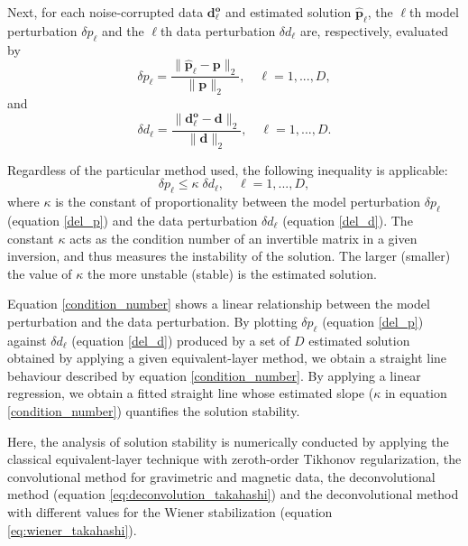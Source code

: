 Next, for each noise-corrupted data $\mathbf{d}^\mathbf{o}_\ell$
and estimated solution $\mathbf{\hat{p}}_\ell$, the $\ell$th model perturbation $\delta p_\ell $
and the $\ell$th data perturbation    $\delta d_\ell$ are,  respectively, evaluated by
\begin{equation}
\delta p_\ell = \frac{\parallel \mathbf{\hat{p}}_\ell - {\mathbf{p}} \parallel_2 }
{\parallel {\mathbf{p}} \parallel _2 }, \quad \ell= 1, ..., D,
\label{del_p}
\end{equation}
and
\begin{equation}
\delta d_\ell = \frac{\parallel \mathbf{d}^\mathbf{o}_\ell - \mathbf{d} \parallel _2 }
{\parallel \mathbf{d}\parallel _2}, \quad \ell = 1, ..., D.
\label{del_d}
\end{equation}

Regardless of the particular method used, the following inequality \citep[][ p. 66]{aster2018parameter}  is applicable:
\begin{equation}
\delta p_\ell \leq \kappa \; \delta d_\ell, \quad \ell = 1, ..., D,
\label{condition_number}
\end{equation}
where $\kappa$ is the constant of proportionality between the model perturbation $\delta p_\ell $ 
(equation \ref{del_p}) and the data perturbation   $\delta d_\ell$ (equation \ref{del_d}).
The constant $\kappa$ acts as the condition number of an invertible matrix in a given inversion, and thus
measures the instability of the solution.
The larger (smaller) the value of $\kappa$ the more unstable (stable) is the estimated solution.

Equation \ref{condition_number} shows a linear relationship between the model perturbation and 
the data perturbation.
By plotting $\delta p_\ell$ (equation \ref{del_p}) against $\delta d_\ell$ (equation \ref{del_d}) 
produced by a set of $D$ estimated solution obtained by applying a given equivalent-layer method, 
we obtain a straight line behaviour described by equation \ref{condition_number}.
By applying a linear regression, we obtain a fitted straight line whose estimated slope 
($\kappa$ in equation \ref{condition_number}) quantifies the solution stability.

Here, the  analysis of solution stability is numerically conducted by applying
the classical equivalent-layer technique with zeroth-order Tikhonov regularization,
the convolutional method for gravimetric and magnetic data,
the deconvolutional method (equation \ref{eq:deconvolution_takahashi}) and 
the deconvolutional method with different values for the Wiener stabilization 
(equation \ref{eq:wiener_takahashi}).
